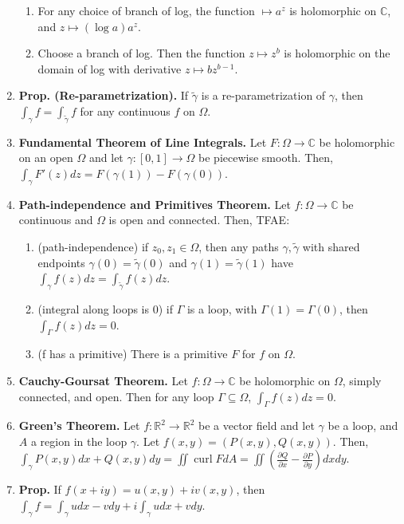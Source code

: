 \documentclass[10pt]{article}
\theoremstyle{definition}
\theoremstyle{named}
\DeclareMathOperator{\curl}{curl}
\begin{document}
\begin{enumerate}
\begin{enumerate}
        \item For any choice of branch of log, the function $\mapsto a^z$ is holomorphic on $\mathbb{C}$, and $z \mapsto (\log a) a^z$. 
        \item Choose a branch of log. Then the function $z \mapsto z^b$ is holomorphic on the domain of log with derivative $z \mapsto bz^{b-1}$. 
    \end{enumerate}
    \item \textbf{Prop. (Re-parametrization). } If $\tilde{\gamma}$ is a re-parametrization of $\gamma$, then $\int_{\gamma} f = \int_{\tilde{\gamma}} f$ for any continuous $f$ on $\Omega$. 
    \item \textbf{Fundamental Theorem of Line Integrals. } Let $F: \Omega \to \mathbb{C}$ be holomorphic on an open $\Omega$ and let $\gamma: [0,1] \to \Omega$ be piecewise smooth. Then, $\int_{\gamma} F'(z) dz = F(\gamma(1)) - F(\gamma(0))$. 
    \item \textbf{Path-independence and Primitives Theorem. } Let $f: \Omega \to \mathbb{C}$ be continuous and $\Omega$ is open and connected. Then, TFAE: 
    \begin{enumerate}
        \item (path-independence) if $z_0, z_1 \in \Omega$, then any paths $\gamma, \tilde{\gamma}$ with shared endpoints $\gamma(0) = \tilde{\gamma}(0)$ and $\gamma(1) = \tilde{\gamma}(1)$ have $\int_{\gamma} f(z) dz = \int_{\tilde{\gamma}} f(z) dz$. 
        \item (integral along loops is 0) if $\Gamma$ is a loop, with $\Gamma(1) = \Gamma(0)$, then $\int_{\Gamma} f(z) dz = 0$. 
        \item (f has a primitive) There is a primitive $F$ for $f$ on $\Omega$.  
    \end{enumerate}
    \item \textbf{Cauchy-Goursat Theorem. } Let $f: \Omega \to \mathbb{C}$ be holomorphic on $\Omega$, simply connected, and open. Then for any loop $\Gamma \subseteq \Omega$, $\int_{\Gamma} f(z) dz = 0$. 
    \item \textbf{Green's Theorem. } Let $f: \mathbb{R}^2 \to \mathbb{R}^2$ be a vector field and let $\gamma$ be a loop, and $A$ a region in the loop $\gamma$. Let $f(x,y) = (P(x,y), Q(x,y))$. Then, $\int_{\gamma} P(x,y) dx + Q(x,y) dy = \iint \curl F  dA = \iint \left(\frac{\partial Q}{\partial x} - \frac{\partial P}{\partial y}\right) dxdy$. 
    \item \textbf{Prop. } If $f(x+iy) = u(x,y) + iv(x,y)$, then $\int_{\gamma} f = \int_{\gamma} udx - vdy + i\int_\gamma u dx + vdy$. 

\end{enumerate}
\end{document}
